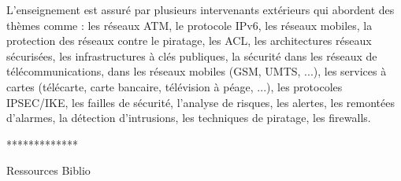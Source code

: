 {
L'enseignement est assuré par plusieurs intervenants extérieurs qui
abordent des thèmes comme : les réseaux ATM, le protocole IPv6, les
réseaux mobiles, la protection des réseaux contre le piratage, les ACL, les
architectures réseaux sécurisées, les infrastructures à clés publiques, la
sécurité dans les réseaux de télécommunications, dans les réseaux
mobiles (GSM, UMTS, ...), les services à cartes (télécarte, carte bancaire,
télévision à péage, ...), les protocoles IPSEC/IKE, les failles de sécurité,
l'analyse de risques, les alertes, les remontées d'alarmes, la détection
d'intrusions, les techniques de piratage, les firewalls.
} 
{} 
{\begin{itemize} 
    \ObjItem **************
\end{itemize} 
} 
{Ressources} 
{Biblio} 
 
\vfill

